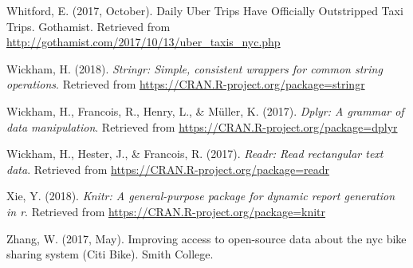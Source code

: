 \documentclass[12pt,twoside]{reedthesis}
\theoremstyle{definition}
\theoremstyle{definition}
\theoremstyle{definition}
\theoremstyle{remark}
\begin{document}
\hypertarget{ref-emma2017}{}
Whitford, E. (2017, October). Daily Uber Trips Have Officially
Outstripped Taxi Trips. Gothamist. Retrieved from
\url{http://gothamist.com/2017/10/13/uber_taxis_nyc.php}

\hypertarget{ref-pkgstringr}{}
Wickham, H. (2018). \emph{Stringr: Simple, consistent wrappers for
common string operations}. Retrieved from
\url{https://CRAN.R-project.org/package=stringr}

\hypertarget{ref-pkgdplyr}{}
Wickham, H., Francois, R., Henry, L., \& Müller, K. (2017). \emph{Dplyr:
A grammar of data manipulation}. Retrieved from
\url{https://CRAN.R-project.org/package=dplyr}

\hypertarget{ref-pkgreadr}{}
Wickham, H., Hester, J., \& Francois, R. (2017). \emph{Readr: Read
rectangular text data}. Retrieved from
\url{https://CRAN.R-project.org/package=readr}

\hypertarget{ref-pkgknitr}{}
Xie, Y. (2018). \emph{Knitr: A general-purpose package for dynamic
report generation in r}. Retrieved from
\url{https://CRAN.R-project.org/package=knitr}

\hypertarget{ref-zhang2017}{}
Zhang, W. (2017, May). Improving access to open-source data about the
nyc bike sharing system (Citi Bike). Smith College.


\end{document}
